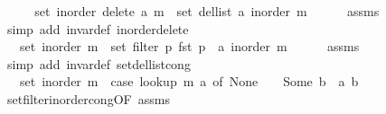 \begin{isabellebody}
\ {\isacharminus}{\kern0pt}\isanewline
\ \ \isamarkupfalse%
\ {\isachardoublequoteopen}set\ {\isacharparenleft}{\kern0pt}inorder\ {\isacharparenleft}{\kern0pt}delete\ a\ m{\isacharparenright}{\kern0pt}{\isacharparenright}{\kern0pt}\ {\isacharequal}{\kern0pt}\ set\ {\isacharparenleft}{\kern0pt}del{\isacharunderscore}{\kern0pt}list\ a\ {\isacharparenleft}{\kern0pt}inorder\ m{\isacharparenright}{\kern0pt}{\isacharparenright}{\kern0pt}{\isachardoublequoteclose}\isanewline
\ \ \ \ \isamarkupfalse%
\ assms\isanewline
\ \ \ \ \isamarkupfalse%
\ {\isacharparenleft}{\kern0pt}simp\ add{\isacharcolon}{\kern0pt}\ invar{\isacharunderscore}{\kern0pt}def\ inorder{\isacharunderscore}{\kern0pt}delete{\isacharparenright}{\kern0pt}\isanewline
\ \ \isamarkupfalse%
\ \isamarkupfalse%
\ {\isachardoublequoteopen}{\isachardot}{\kern0pt}{\isachardot}{\kern0pt}{\isachardot}{\kern0pt}\ {\isacharequal}{\kern0pt}\ set\ {\isacharparenleft}{\kern0pt}inorder\ m{\isacharparenright}{\kern0pt}\ {\isacharminus}{\kern0pt}\ set\ {\isacharparenleft}{\kern0pt}filter\ {\isacharparenleft}{\kern0pt}{\isasymlambda}p{\isachardot}{\kern0pt}\ fst\ p\ {\isacharequal}{\kern0pt}\ a{\isacharparenright}{\kern0pt}\ {\isacharparenleft}{\kern0pt}inorder\ m{\isacharparenright}{\kern0pt}{\isacharparenright}{\kern0pt}{\isachardoublequoteclose}\isanewline
\ \ \ \ \isamarkupfalse%
\ assms\isanewline
\ \ \ \ \isamarkupfalse%
\ {\isacharparenleft}{\kern0pt}simp\ add{\isacharcolon}{\kern0pt}\ invar{\isacharunderscore}{\kern0pt}def\ set{\isacharunderscore}{\kern0pt}del{\isacharunderscore}{\kern0pt}list{\isacharunderscore}{\kern0pt}cong{\isacharparenright}{\kern0pt}\isanewline
\ \ \isamarkupfalse%
\ \isamarkupfalse%
\ {\isachardoublequoteopen}{\isachardot}{\kern0pt}{\isachardot}{\kern0pt}{\isachardot}{\kern0pt}\ {\isacharequal}{\kern0pt}\ set\ {\isacharparenleft}{\kern0pt}inorder\ m{\isacharparenright}{\kern0pt}\ {\isacharminus}{\kern0pt}\ {\isacharparenleft}{\kern0pt}case\ lookup\ m\ a\ of\ None\ {\isasymRightarrow}\ {\isacharbraceleft}{\kern0pt}{\isacharbraceright}{\kern0pt}\ {\isacharbar}{\kern0pt}\ Some\ b\ {\isasymRightarrow}\ {\isacharbraceleft}{\kern0pt}{\isacharparenleft}{\kern0pt}a{\isacharcomma}{\kern0pt}\ b{\isacharparenright}{\kern0pt}{\isacharbraceright}{\kern0pt}{\isacharparenright}{\kern0pt}{\isachardoublequoteclose}\isanewline
\ \ \ \ \isamarkupfalse%
\ set{\isacharunderscore}{\kern0pt}filter{\isacharunderscore}{\kern0pt}inorder{\isacharunderscore}{\kern0pt}cong{\isacharbrackleft}{\kern0pt}OF\ assms{\isacharbrackright}{\kern0pt}\isanewline

\end{isabellebody}
